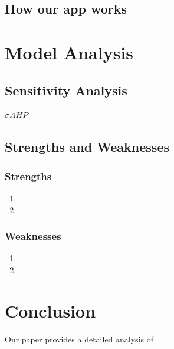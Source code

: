 \documentclass{mcmthesis}
\begin{document}
\subsection{How our app works}





\section{Model Analysis}
\subsection{Sensitivity Analysis}

$\sigma$$AHP$

\subsection{Strengths and Weaknesses}
\subsubsection{Strengths}
\begin{enumerate}
    \item 
    \item

\end{enumerate}

\subsubsection{Weaknesses}
\begin{enumerate}
    \item 
    \item

\end{enumerate}

\section{Conclusion}
Our paper provides a detailed analysis of

\newpage
\end{document}
